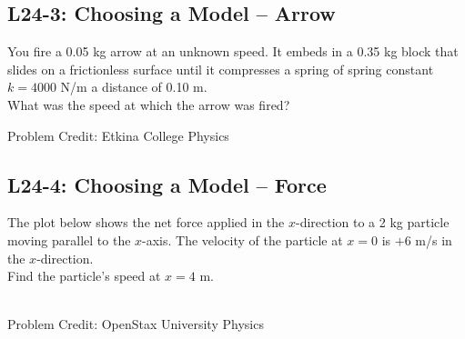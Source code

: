 \documentclass[]{article}
\newcommand{\Week}{24}
\begin{document}
\begin{PresentSpace}
\vspace{-10pt}
\section*{L\Week-3: Choosing a Model -- Arrow}
\vspace{-5pt}
You fire a 0.05 kg arrow at an unknown speed. It embeds in a 0.35 kg block that slides on a frictionless surface until it compresses a spring of spring constant $k=4000$ N/m a distance of 0.10 m. \\

\noindent What was the speed at which the arrow was fired?
\vspace{3.5cm}
\begin{center}
	\small
	Problem Credit: Etkina College Physics
\end{center}
\end{PresentSpace}
\newpage
\begin{TeacherMargin}

\end{TeacherMargin}
\begin{PresentSpace}
\vspace{-10pt}
\section*{L\Week-4: Choosing a Model -- Force}
\vspace{-5pt}
The plot below shows the net force applied in the $x$-direction to a 2 kg particle moving parallel to the $x$-axis. The velocity of the particle at $x=0$ is $+6$ m/s in the $x$-direction. \\

\noindent Find the particle's speed at $x=4$ m.
\begin{center}
	 \\
	\small
	Problem Credit: OpenStax University Physics
\end{center}
\end{PresentSpace}
\end{document}
